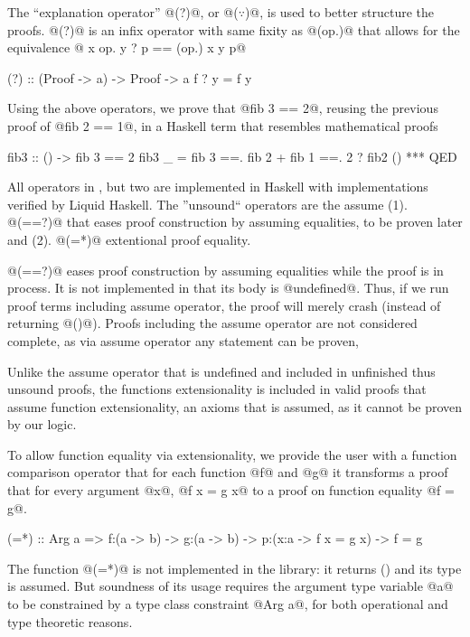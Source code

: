 %
The ``explanation operator'' @(?)@, or @($\because$)@, 
is used to better structure the proofs.
%
@(?)@ is an infix operator with same fixity as @(op.)@
that allows for the equivalence
%
@ x op. y ? p == (op.) x y p@
%
\begin{code}
  (?) :: (Proof -> a) -> Proof -> a
  f ? y = f y
\end{code}

%
Using the above operators,
we prove that @fib 3 == 2@,
reusing the previous proof of @fib 2 == 1@,
in a Haskell term that resembles mathematical proofs
%
\begin{code}
  fib3 :: () ->  {fib 3 == 2}
  fib3 _
    =   fib 3
    ==. fib 2 + fib 1
    ==. 2             ? fib2 ()
    *** QED
\end{code}


All operators in \libname, but two are implemented in Haskell
with implementations verified by Liquid Haskell. 
%
The ''unsound`` operators are the assume 
(1). @(==?)@ that eases proof construction by assuming equalities, to be proven later
and (2). @(=*)@ extentional proof equality. 

 @(==?)@ eases proof construction by 
assuming equalities while the proof is in process. 
%
It is not implemented in that its body is @undefined@. 
%
Thus, if we run proof terms including assume operator, the proof will merely crash
(instead of returning @()@). 
%
Proofs including the assume operator are not considered complete, 
as via assume operator any statement can be proven, 

Unlike the assume operator that is undefined and 
included in unfinished thus unsound proofs, 
the functions extensionality is included in valid proofs
that assume function extensionality, an axioms that is assumed, 
as it cannot be proven by our logic. 

To allow function equality via extensionality, 
we provide the user with a function comparison operator
that for each function @f@ and @g@ it transforms a proof 
that for every argument @x@, @f x = g x@ to a proof 
on function equality @f = g@. 
\begin{code}
(=*) :: Arg a => f:(a -> b) -> g:(a -> b)
     -> p:(x:a -> {f x = g x})
     -> {f = g}
\end{code}
%
The function @(=*)@ is not implemented in the library: 
it returns () and its type is assumed. 
%
But soundness of its usage requires the argument type variable @a@
to be constrained by a type class constraint @Arg a@, 
for both operational and type theoretic reasons.
%

